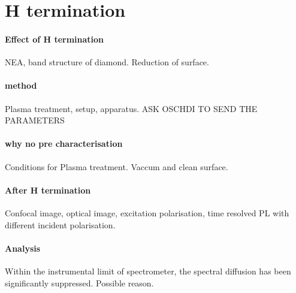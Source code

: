 \section[H termination]{H termination}
\paragraph{Effect of H termination}

NEA, band structure of diamond. Reduction of surface.
\paragraph{method} Plasma treatment, setup, apparatus.
ASK OSCHDI TO SEND THE PARAMETERS

\paragraph{why no pre characterisation} Conditions for Plasma treatment.
Vaccum and clean surface.
\paragraph{After H termination} Confocal image, optical image, excitation polarisation, time resolved PL with different incident polarisation.

\paragraph{Analysis} Within the instrumental limit of spectrometer, the spectral diffusion has been significantly suppressed. Possible reason.
